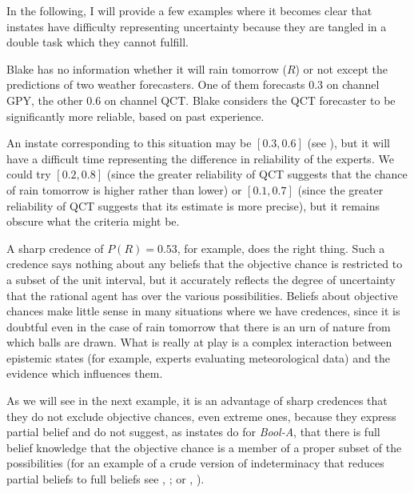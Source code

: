 \documentclass[11pt]{article}
\newcommand{\anderson}[0]{\textit{Bool-A}}
\begin{document}
In the following, I will provide a few examples where it becomes clear
that instates have difficulty representing uncertainty because they
are tangled in a double task which they cannot fulfill.

\begin{quotex}
  \label{ex:aggreg} Blake has no
  information whether it will rain tomorrow ($R$) or not except the
  predictions of two weather forecasters. One of them forecasts 0.3 on
  channel GPY, the other 0.6 on channel QCT. Blake considers the QCT
  forecaster to be significantly more reliable, based on past
  experience.
\end{quotex}

An instate corresponding to this situation may be $[0.3,0.6]$ (see
), but it will have a difficult time
representing the difference in reliability of the experts. We could
try $[0.2,0.8]$ (since the greater reliability of QCT suggests that
the chance of rain tomorrow is higher rather than lower) or
$[0.1,0.7]$ (since the greater reliability of QCT suggests that its
estimate is more precise), but it remains obscure what the criteria
might be.

A sharp credence of $P(R)=0.53$, for example, does the right thing.
Such a credence says nothing about any beliefs that the objective
chance is restricted to a subset of the unit interval, but it
accurately reflects the degree of uncertainty that the rational agent
has over the various possibilities. Beliefs about objective chances
make little sense in many situations where we have credences, since it
is doubtful even in the case of rain tomorrow that there is an urn of
nature from which balls are drawn. What is really at play is a complex
interaction between epistemic states (for example, experts evaluating
meteorological data) and the evidence which influences them.

As we will see in the next example, it is an advantage of sharp
credences that they do not exclude objective chances, even extreme
ones, because they express partial belief and do not suggest, as
instates do for {\anderson}, that there is full belief knowledge
that the objective chance is a member of a proper subset of the
possibilities (for an example of a crude version of indeterminacy that
reduces partial beliefs to full beliefs see ,
; or ,
).
\end{document}
